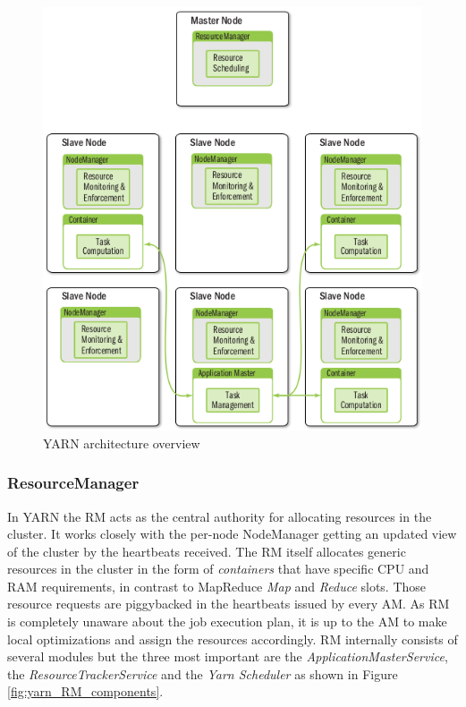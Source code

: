 \begin{figure}
\centering
\includegraphics[scale=0.5]{resources/images/Background/yarn_arch_overview.png}
\caption{YARN architecture overview \cite{Murthy:2014:AHY:2636998}}
\label{fig:yarn_arch_overview}
\end{figure}

\subsubsection{ResourceManager}
\label{sssec:rm}
In YARN the RM acts as the central authority for allocating resources
in the cluster. It works closely with the per-node NodeManager getting
an updated view of the cluster by the heartbeats received. The RM
itself allocates generic resources in the cluster in the form of
\emph{containers} that have specific CPU and RAM requirements, in
contrast to MapReduce \emph{Map} and \emph{Reduce} slots. Those
resource requests are piggybacked in the heartbeats issued by every AM.
As RM is completely unaware about the job execution plan,
it is up to the AM to make local optimizations and assign the
resources accordingly. RM internally consists of several modules but
the three most important are the \emph{ApplicationMasterService}, the
\emph{ResourceTrackerService} and the \emph{Yarn Scheduler} as shown
in Figure \ref{fig:yarn_RM_components}.

